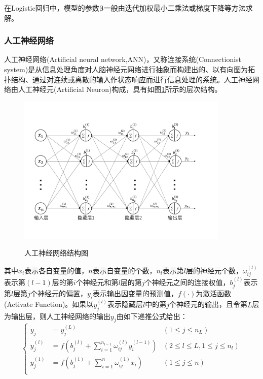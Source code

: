 \documentclass[a4paper]{ctexart}
\begin{document}
在Logistic回归中，模型的参数$\bm\beta$一般由迭代加权最小二乘法或梯度下降等方法求解\cite{RN92}。

\subsubsection{人工神经网络}\label{sec:人工神经网络}
人工神经网络(Artificial neural network,ANN)，又称连接系统(Connectionist system)是从信息处理角度对人脑神经元网络进行抽象而构建出的、以有向图为拓扑结构、通过对连续或离散的输入作状态响应而进行信息处理的系统\cite{RN2}。人工神经网络由人工神经元(Artificial Neuron)构成，具有如图\ref{figure:network}所示的层次结构\cite{RN2}。
\begin{figure}[htbp]
	\centering
	\includegraphics[width=0.9\textwidth, keepaspectratio]{figure/network.pdf}\\
	\caption{人工神经网络结构图}\label{figure:network}
\end{figure}
其中$x_i$表示各自变量的值，$n$表示自变量的个数，$n_l$表示第$l$层的神经元个数，$\omega_{ij}^{(l)}$表示第$(l-1)$层的第$i$个神经元和第$l$层的第$j$个神经元之间的连接权值，$b_j^{(l)}$表示第$l$层第$j$个神经元的偏置，$y_i$表示输出因变量的预测值，$f(\cdot)$为激活函数(Activate Function)。如果以$y_j^{(l)}$表示隐藏层$l$中的第$j$个神经元的输出，且令第$L$层为输出层，则人工神经网络的输出$y_j$由如下递推公式给出\cite{RN2}：
\begin{equation}\label{eq:神经网络公式}
	\left\{
	\begin{aligned}
		y_j       & =y_j^{(L)}                                                                & (1\leq j\leq n_L)               \\
		y_j^{(l)} & =f\left(b_j^{(l)}+\sum_{i=1}^{n_{l-1}}\omega_{ij}^{(l)}y_i^{(l-1)}\right) & (2\leq l\leq L,1\leq j\leq n_l) \\
		y_j^{(1)} & =f\left(b_j^{(1)}+\sum_{i=1}^n\omega_{ij}^{(1)}x_i\right)                 & (1\leq j\leq n)                 \\
	\end{aligned}
	\right.
\end{equation}
\end{document}
